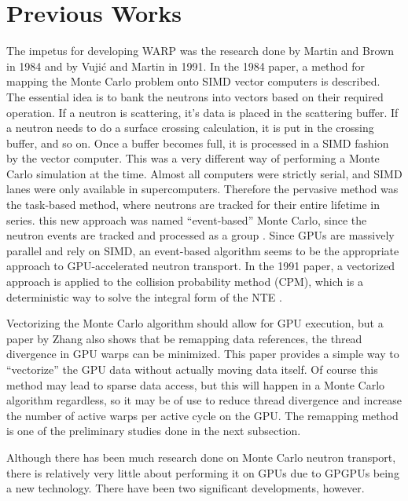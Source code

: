 
\section{Previous Works}

The impetus for developing WARP was the research done by Martin and Brown in 1984 and by Vuji\'{c} and Martin in 1991.  In the 1984 paper, a method for mapping the Monte Carlo problem onto SIMD vector computers is described.  The essential idea is to bank the neutrons into vectors based on their required operation.  If a neutron is scattering, it's data is placed in the scattering buffer.  If a neutron needs to do a surface crossing calculation, it is put in the crossing buffer, and so on.  Once a buffer becomes full, it is processed in a SIMD fashion by the vector computer.  This was a very different way of performing a Monte Carlo simulation at the time.  Almost all computers were strictly serial, and SIMD lanes were only available in supercomputers.  Therefore the pervasive method was the task-based method, where neutrons are tracked for their entire lifetime in series.  this new approach was named ``event-based'' Monte Carlo, since the neutron events are tracked and processed as a group \cite{vector}.  Since GPUs are massively parallel and rely on SIMD, an event-based algorithm seems to be the appropriate approach to GPU-accelerated neutron transport.  In the 1991 paper, a vectorized approach is applied to the collision probability method (CPM), which is a deterministic way to solve the integral form of the NTE \cite{vujic_vector}.

Vectorizing the Monte Carlo algorithm should allow for GPU execution, but a paper by Zhang \cite{on_the_fly_remapping} also shows that be remapping data references, the thread divergence in GPU warps can be minimized.  This paper provides a simple way to ``vectorize'' the GPU data without actually moving data itself.  Of course this method may lead to sparse data access, but this will happen in a Monte Carlo algorithm regardless, so it may be of use to reduce thread divergence and increase the number of active warps per active cycle on the GPU.  The remapping method is one of the preliminary studies done in the next subsection.

Although there has been much research done on Monte Carlo neutron transport, there is relatively very little about performing it on GPUs due to GPGPUs being a new technology.  There have been two significant developments, however.  


